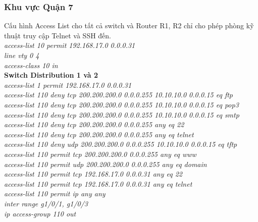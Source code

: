 \documentclass[a4paper, 12pt]{article}
\begin{document}
\subsubsection{Khu vực Quận 7}
\hspace*{1cm}Cấu hình Access List cho tất cả switch và Router R1, R2 chỉ cho phép phòng kỹ thuật truy cập Telnet và SSH đến.\\
\hspace*{2cm}\textit{access-list 10 permit 192.168.17.0 0.0.0.31\\
\hspace*{2cm}line vty 0 4\\
\hspace*{2cm}access-class 10 in\\}
\hspace*{1cm}\textbf{Switch Distribution 1 và 2}\\
\hspace*{2cm}\textit{access-list 1 permit 192.168.17.0 0.0.0.31\\
\hspace*{2cm}access-list 110 deny tcp 200.200.200.0 0.0.0.255 10.10.10.0 0.0.0.15 eq ftp\\
\hspace*{2cm}access-list 110 deny tcp 200.200.200.0 0.0.0.255 10.10.10.0 0.0.0.15 eq pop3\\
\hspace*{2cm}access-list 110 deny tcp 200.200.200.0 0.0.0.255 10.10.10.0 0.0.0.15 eq smtp\\
\hspace*{2cm}access-list 110 deny tcp 200.200.200.0 0.0.0.255 any eq 22\\
\hspace*{2cm}access-list 110 deny tcp 200.200.200.0 0.0.0.255 any eq telnet\\
\hspace*{2cm}access-list 110 deny udp 200.200.200.0 0.0.0.255 10.10.10.0 0.0.0.15 eq tftp\\
\hspace*{2cm}access-list 110 permit tcp 200.200.200.0 0.0.0.255 any eq www\\
\hspace*{2cm}access-list 110 permit udp 200.200.200.0 0.0.0.255 any eq domain\\
\hspace*{2cm}access-list 110 permit tcp 192.168.17.0 0.0.0.31 any eq 22\\
\hspace*{2cm}access-list 110 permit tcp 192.168.17.0 0.0.0.31 any eq telnet\\
\hspace*{2cm}access-list 110 permit ip any any\\
\hspace*{2cm}inter range g1/0/1, g1/0/3\\
\hspace*{2cm}ip access-group 110 out\\ }
\end{document}
